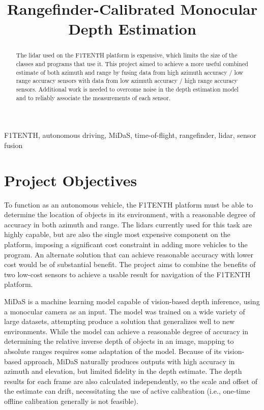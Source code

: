 \documentclass[conference]{IEEEtran}
\begin{document}
\title{Rangefinder-Calibrated Monocular Depth Estimation}

\author{
\and
\and
\and
}

\maketitle

\begin{abstract}
The lidar used on the F1TENTH platform is expensive, which limits the size of
the classes and programs that use it. This project aimed to achieve a more
useful combined estimate of both azimuth and range by fusing data from high
azimuth accuracy / low range accuracy sensors with data from low azimuth
accuracy / high range accuracy sensors. Additional work is needed to overcome
noise in the depth estimation model and to reliably associate the measurements
of each sensor.
\end{abstract}

\begin{IEEEkeywords}
F1TENTH, autonomous driving, MiDaS, time-of-flight, rangefinder, lidar, sensor
fusion
\end{IEEEkeywords}

\section{Project Objectives}
To function as an autonomous vehicle, the F1TENTH platform must be able to
determine the location of objects in its environment, with a reasonable degree
of accuracy in both azimuth and range. The lidars currently used for this task
are highly capable, but are also the single most expensive component on the
platform, imposing a significant cost constraint in adding more vehicles to the
program. An alternate solution that can achieve reasonable accuracy with lower
cost would be of substantial benefit. The project aims to combine the benefits
of two low-cost sensors to achieve a usable result for navigation of the
F1TENTH platform.

MiDaS is a machine learning model capable of vision-based depth inference,
using a monocular camera as an input. The model was trained on a wide variety
of large datasets, attempting produce a solution that generalizes well to new
environments. While the model can achieve a reasonable degree of accuracy in
determining the relative inverse depth of objects in an image, mapping to
absolute ranges requires some adaptation of the model. Because of its
vision-based approach, MiDaS naturally produces outputs with high accuracy in
azimuth and elevation, but limited fidelity in the depth estimate. The depth
results for each frame are also calculated independently, so the scale and
offset of the estimate can drift, necessitating the use of active calibration
(i.e., one-time offline calibration generally is not feasible).
\end{document}
